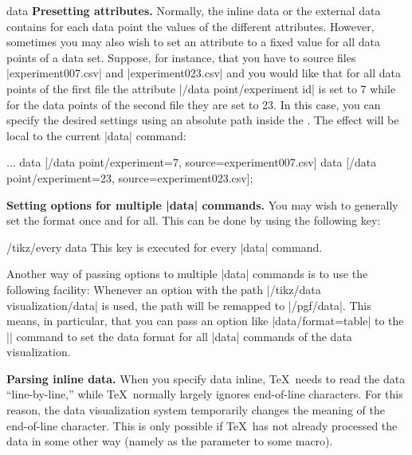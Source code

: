 \begin{datavisualizationoperation}{data}{}
  \medskip
  \textbf{Presetting attributes.}
  Normally, the inline data or the external data contains for each
  data point the values of the different attributes. However,
  sometimes you may also wish to set an attribute to a fixed value for
  all data points of a data set. Suppose, for instance, that you have
  to source files |experiment007.csv| and |experiment023.csv| and you
  would like that for all data points of the first file the attribute
  |/data point/experiment id| is set to 7 while for the data points of
  the second file they are set to 23. In this case, you can specify
  the desired settings using an absolute path inside the
  . The effect will be local to the current |data|
  command:
\begin{codeexample}
\datavisualization...
  data [/data point/experiment=7,  source=experiment007.csv]
  data [/data point/experiment=23, source=experiment023.csv];
\end{codeexample}

  \begin{codeexample}[]
\end{codeexample}

  \medskip
  \textbf{Setting options for multiple |data| commands.}
  You may wish to generally set the format once and for all. This can
  be done by using the following key:
  \begin{stylekey}{/tikz/every data}
    This key is executed for every |data| command.
  \end{stylekey}

  Another way of passing options to multiple |data| commands is to use
  the following facility: Whenever an option with the path
  |/tikz/data visualization/data| is used, the path will be remapped
  to  |/pgf/data|. This means, in particular, that you can pass an
  option like |data/format=table| to the |\datavisualization| command
  to set the data format for all |data| commands of the data
  visualization.

  \medskip
  \textbf{Parsing inline data.}
  When you specify data inline, \TeX\ needs to read the data
  ``line-by-line,'' while \TeX\ normally largely ignores end-of-line
  characters. For this reason, the data visualization system
  temporarily changes the meaning of the end-of-line character. This
  is only possible if \TeX\ has not already processed the data in some
  other way (namely as the parameter to some macro).


\end{datavisualizationoperation}
